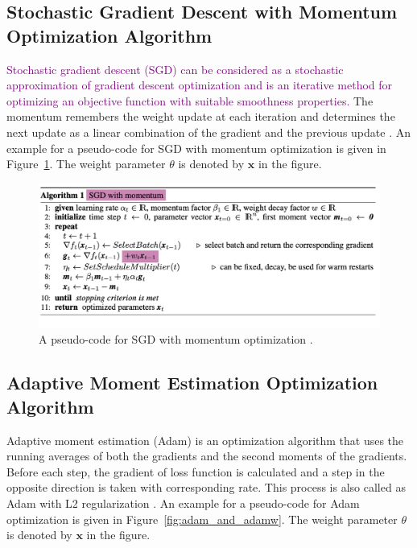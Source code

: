 \subsection{Stochastic Gradient Descent with Momentum  Optimization Algorithm}

\textcolor{purple}{Stochastic gradient descent (SGD) can be considered as a stochastic approximation of gradient descent optimization \cite{gradient_descent_algorithms} and is an iterative method for optimizing an objective function with suitable smoothness properties.} The momentum remembers the weight update at each iteration and determines the next update as a linear combination of the gradient and the previous update \cite{SGD_Momentum}. An example for a pseudo-code for SGD with momentum optimization is given in Figure~\ref{fig:sgd_momentum}. The weight parameter $\theta$ is denoted by $\textbf{x}$ in the figure.

\begin{figure}[h]
	\centering
	\includegraphics[width=\linewidth]{fig/sgd_momentum.png}
	\caption{A pseudo-code for SGD with momentum optimization \cite{weight_decay_regularization}.}
	\label{fig:sgd_momentum}
\end{figure}

\subsection{Adaptive Moment Estimation Optimization Algorithm}

Adaptive moment estimation (Adam) is an optimization algorithm that uses the running averages of both the gradients and the second moments of the gradients. Before each step, the gradient of loss function is calculated and a step in the opposite direction is taken with corresponding rate. This process is also called as Adam with L2 regularization \cite{Adam}. An example for a pseudo-code for Adam optimization is given in Figure~\ref{fig:adam_and_adamw}. The weight parameter $\theta$ is denoted by $\textbf{x}$ in the figure.

